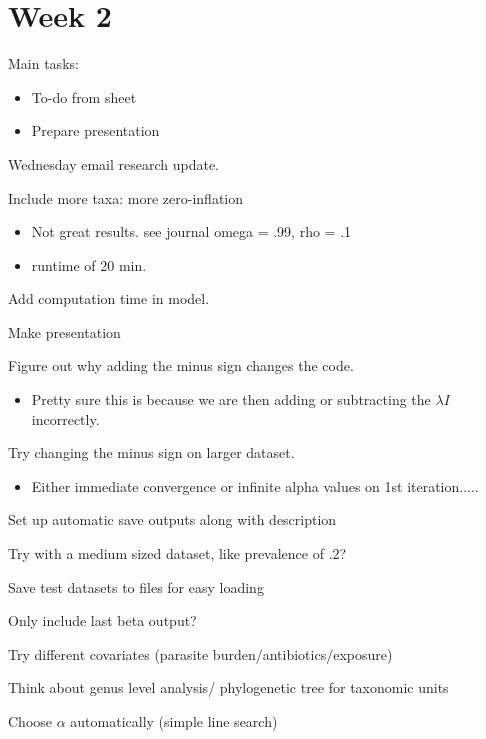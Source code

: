 \documentclass[10pt]{article}
\newcommand{\cmark}{\ding{51}}%
\newcommand{\done}{\rlap{$\square$}{\raisebox{2pt}{\large\hspace{1pt}\cmark}}%
\hspace{-2.5pt}}
\theoremstyle{definition}
\begin{document}
\section{Week 2}
Main tasks:
\begin{itemize}
  \item To-do from sheet
  \item Prepare presentation
\end{itemize}


\begin{todolist}
  \item[\done] Wednesday email research update.
  \item[\done] Include more taxa: more zero-inflation
  \begin{itemize}
    \item Not great results. see journal omega = .99, rho = .1
    \item runtime of 20 min.
  \end{itemize}
  \item[\done] Add computation time in model.
  \item[\done] Make presentation
  \item[\done] Figure out why adding the minus sign changes the code.
  \begin{itemize}
    \item Pretty sure this is because we are then adding or subtracting the $\lambda I$ incorrectly.
  \end{itemize}
  \item[\done] Try changing the minus sign on larger dataset.
  \begin{itemize}
    \item Either immediate convergence or infinite alpha values on 1st iteration.....
  \end{itemize}
  \item[\done] Set up automatic save outputs along with description
  \item[\done] Try with a medium sized dataset, like prevalence of .2?
  \item[\done] Save test datasets to files for easy loading
  \item[\done] Only include last beta output?
  \item Try different covariates (parasite burden/antibiotics/exposure)
  \item Think about genus level analysis/ phylogenetic tree for taxonomic units
  \item Choose $\alpha$ automatically (simple line search)

\end{todolist}
\end{document}

